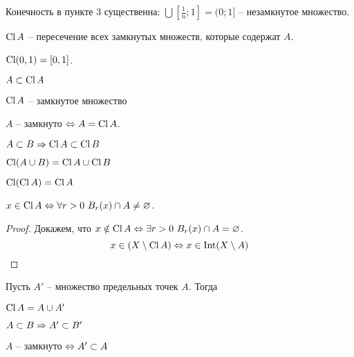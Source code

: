     \begin{Rem}
        Конечность в пункте 3 существенна: $\bigcup \left[\frac{1}{n}; 1\right] = (0; 1]$ -- незамкнутое множество.
    \end{Rem}

    \begin{notation}
        $\operatorname{Cl} A$ -- пересечение всех замкнутых множеств, которые содержат $A$. 
    \end{notation}

    \begin{Example}
        $\operatorname{Cl} (0, 1) = [0, 1]$. 
    \end{Example}

    \begin{Thm}[Свойства]
        \begin{MyList}
            \item $A \subset \operatorname{Cl} A$
            \item $\operatorname{Cl} A$ -- замкнутое множество
            \item $A$ -- замкнуто $\Leftrightarrow A = \operatorname{Cl} A$.
            \item $A \subset B \Rightarrow \operatorname{Cl} A \subset \operatorname{Cl} B$
            \item $\operatorname{Cl} (A \cup B) = \operatorname{Cl} A \cup \operatorname{Cl} B$
            \item $\operatorname{Cl} (\operatorname{Cl} A) = \operatorname{Cl} A$      
        \end{MyList}
    \end{Thm}

    \begin{Thm}
        $x \in \operatorname{Cl} A \Leftrightarrow \forall r > 0 \ B_r(x) \cap A \neq \varnothing$. 
    \end{Thm}

    \begin{proof}
        Докажем, что $x \notin \operatorname{Cl} A \Leftrightarrow \exists r > 0 \ B_r(x) \cap A = \varnothing$.
        \[x \in \left(X \setminus \operatorname{Cl} A\right) \Leftrightarrow x \in \operatorname{Int} (X \setminus A)\]
    \end{proof}

    Пусть $A'$ -- множество предельных точек $A$. Тогда
    \begin{Thm}[Свойства]
        \begin{MyList}
            \item $\operatorname{Cl} A = A \cup A'$ 
            \item $A \subset B \Rightarrow A' \subset B'$ 
            \item $A$ -- замкнуто $\Leftrightarrow A' \subset A$
        \end{MyList}
    \end{Thm}

